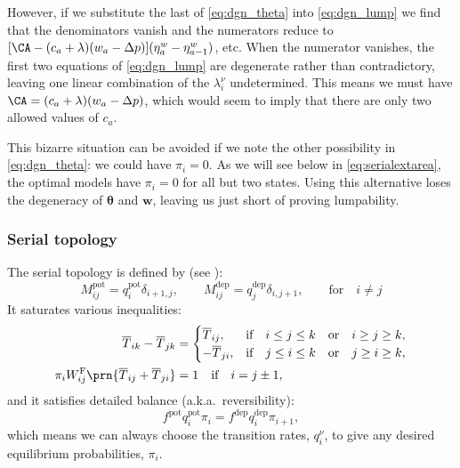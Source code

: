 \documentclass[12pt]{article}
\newcommand{\eqm}{\pi}
\newcommand{\fptm}{T}
\newcommand{\fptbm}{\overline{\fptm}}
\newcommand{\etwm}{\eta^w}
\newcommand{\thbm}{\theta}
\newcommand{\thb}{\boldsymbol{\thbm}}
\newcommand{\wm}{w}
\newcommand{\w}{\mathbf{\wm}}
\newcommand{\Wm}{W}
\newcommand{\MMdm}{M}
\newcommand{\frgm}{\Wm^{\mathrm{F}}}
\newcommand{\pot}{^{\text{pot}}}
\newcommand{\dep}{^{\text{dep}}}
\begin{document}
However, if we substitute the last of \cref{eq:dgn_theta} into \cref{eq:dgn_lump} we find that the denominators vanish and the numerators reduce to \( [\CA - (c_a + \lambda) (\wm_a - \Delta p)] (\etwm_a - \etwm_{a-1}) \), etc.
When the numerator vanishes, the first two equations of \cref{eq:dgn_lump} are degenerate rather than contradictory, leaving one linear combination of the \(\lambda^\nu_i\) undetermined.
This means we must have \( \CA = (c_a + \lambda) (\wm_a - \Delta p) \), which would seem to imply that there are only two allowed values of \(c_a\).

This bizarre situation can be avoided if we note the other possibility in \cref{eq:dgn_theta}: we could have \(\eqm_i = 0\).
As we will see below in \cref{eq:serialextarea}, the optimal models have \(\eqm_i = 0\) for all but two states.
Using this alternative loses the degeneracy of \(\thb\) and \(\w\), leaving us just short of proving lumpability.

\subsubsection{Serial topology}\label{sec:serialarea}

The serial topology is defined by (see \cite{Leibold2008serial,Ben-DayanRubin2007sparse}):
%
\begin{equation}\label{eq:serialdef}
  \MMdm\pot_{ij} = q\pot_i \delta_{i+1,j},
  \qquad
  \MMdm\dep_{ij} = q\dep_j \delta_{i,j+1},
  \qquad \text{for}\quad i \neq j
\end{equation}
%
It saturates various inequalities:
%
\begin{equation}\label{eq:serialineq}
  \begin{aligned}
    \fptbm_{ik} - \fptbm_{jk} &=
      \begin{cases}
        \fptbm_{ij},  &\text{if}\quad i \leq j \leq k \quad\text{or}\quad i \geq j \geq k,\\
        -\fptbm_{ji}, &\text{if}\quad j \leq i \leq k \quad\text{or}\quad j \geq i \geq k,\\
      \end{cases} \\
    \eqm_i \frgm_{ij} \prn{\fptbm_{ij}+\fptbm_{ji}} &= 1 \quad\text{if}\quad i=j\pm1,
  \end{aligned}
\end{equation}
%
and it satisfies detailed balance (a.k.a.\ reversibility):
%
\begin{equation}\label{eq:multistateprob}
  f\pot q\pot_i \eqm_i = f\dep q\dep_i \eqm_{i+1},
\end{equation}
%
which means we can always choose the transition rates, $q^\nu_i$, to give any desired equilibrium probabilities, $\eqm_i$.
\end{document}
